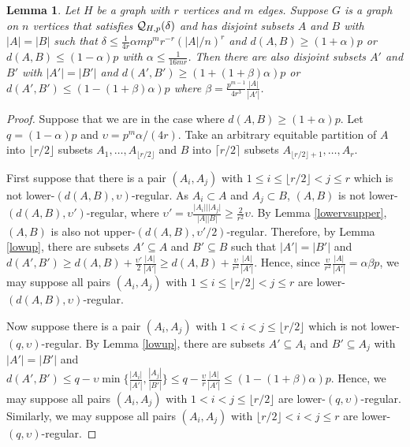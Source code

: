 \documentclass[11pt]{article}
\newtheorem{lemma}{Lemma}[section]
\begin{document}
\begin{lemma} \label{keylem} Let $H$ be a graph with $r$ vertices and $m$ edges. Suppose $G$ is a graph on $n$ vertices that satisfies ${\cal Q}_{H,p}(\delta)$ and has disjoint subsets $A$ and $B$ with $|A|=|B|$ such that $\delta \leq \frac{1}{4r}\alpha mp^m r^{-r} (|A|/n)^r$ and $d(A,B) \geq (1+\alpha)p$ or $d(A,B) \leq (1-\alpha)p$ with $\alpha \leq \frac{1}{16mr}$. Then there are also disjoint subsets $A'$ and $B'$ with $|A'|=|B'|$ and $d(A',B') \geq (1+(1+\beta)\alpha)p$ or $d(A',B') \leq (1-(1+\beta)\alpha)p$ where  $\beta = \frac{p^{m-1}}{4r^3}\frac{|A|}{|A'|}$.  
\end{lemma}
\begin{proof}
Suppose that we are in the case where $d(A,B) \geq  (1+\alpha)p$.
Let $q=(1-\alpha)p$ and $\upsilon = p^m\alpha/(4r)$. Take an arbitrary equitable partition of $A$ into $\lfloor r/2 \rfloor$ subsets  $A_1,\ldots,A_{\lfloor r/2 \rfloor}$ and $B$ into $\lceil r/2 \rceil$ subsets $A_{\lfloor r/2 \rfloor+1},\ldots,A_r$. 

First suppose that there is a pair $(A_i,A_j)$ with $1 \leq i \leq \lfloor r/2 \rfloor < j \leq r$ which is not lower-$(d(A,B),\upsilon)$-regular. As $A_i \subset A$ and $A_j \subset B$, $(A,B)$ is not lower-$(d(A,B),\upsilon')$-regular, where $\upsilon'=\upsilon\frac{|A_i|||A_j|}{|A||B|} \geq \frac{2}{r^2}\upsilon$. By Lemma \ref{lowervsupper}, $(A,B)$ is also not upper-$(d(A,B),\upsilon'/2)$-regular. Therefore, by Lemma \ref{lowup}, there are subsets $A' \subseteq A$ and $B' \subseteq B$ such that $|A'|=|B'|$ and $d(A',B') \geq d(A,B)+\frac{\upsilon'}{2}\frac{|A|}{|A'|} \geq d(A,B)+\frac{\upsilon}{r^2}\frac{|A|}{|A'|}$. Hence, since $\frac{\upsilon}{r^2}\frac{|A|}{|A'|} = \alpha \beta p$, we may suppose all pairs $(A_i,A_j)$ with $1 \leq i \leq \lfloor r/2 \rfloor < j \leq r$ are lower-$(d(A,B),\upsilon)$-regular.

Now suppose there is a pair $(A_i,A_j)$ with $1 < i <  j \leq \lfloor r/2 \rfloor$ which is not lower-$(q,\upsilon)$-regular.  By Lemma \ref{lowup}, there are subsets $A' \subseteq A_i$ and $B' \subseteq A_j$ with $|A'|=|B'|$ and $d(A',B') \leq  q-\upsilon\min\{\frac{|A_i|}{|A'|},\frac{|A_j|}{|B'|}\} \leq q-\frac{\upsilon}{r}\frac{|A|}{|A'|} \leq (1-(1+\beta)\alpha)p$. Hence, we may suppose all pairs $(A_i,A_j)$ with $1 < i <  j \leq \lfloor r/2 \rfloor$ are lower-$(q,\upsilon)$-regular. Similarly, we may suppose all pairs $(A_i,A_j)$ with $ \lfloor r/2 \rfloor < i <  j \leq r$ are lower-$(q,\upsilon)$-regular.


\end{proof}
\end{document}
